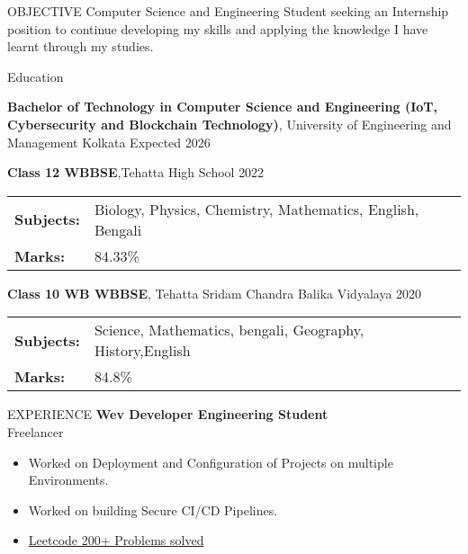 \documentclass{resume}
\begin{document}
\vspace{-0.4em}

\begin{rSection}{OBJECTIVE}
    {Computer Science and Engineering Student seeking an Internship position to continue developing my skills and applying the knowledge I have learnt through my studies.}

\end{rSection}
\vspace{-0.4em}
\begin{rSection}{Education}

    {\bf Bachelor of Technology in Computer Science and Engineering (IoT, Cybersecurity and Blockchain Technology)}, University of Engineering and Management Kolkata \hfill {Expected 2026}\\
    \vspace{-0.4em}

    {\bf Class 12 WBBSE},Tehatta High School \hfill {2022}\\
    \begin{tabular}{>{\bfseries}l l}
        Subjects: & Biology, Physics, Chemistry, Mathematics, English, Bengali \\
        Marks:    & 84.33\%
    \end{tabular}

    {\bf Class 10 WB WBBSE}, Tehatta Sridam Chandra Balika Vidyalaya \hfill {2020}
    \begin{tabular}{>{\bfseries}l l}
        Subjects: & Science, Mathematics, bengali, Geography, History,English \\
        Marks:    & 84.8\%
    \end{tabular}
\end{rSection}
\vspace{-0.4em}

\begin{rSection}{EXPERIENCE}
    {\bf Wev Developer Engineering Student} \\
    \hfill {Freelancer}
    \begin{itemize}
        \item {Worked on Deployment and Configuration of Projects on multiple  Environments.}
              \vspace{-0.4em}
        \item {Worked on building Secure CI/CD Pipelines.}
              \vspace*{-0.4em}
        \item \href{https://leetcode.com/u/trishumandal/}{Leetcode 200+ Problems solved}

    \end{itemize}
\end{rSection}
\end{document}
